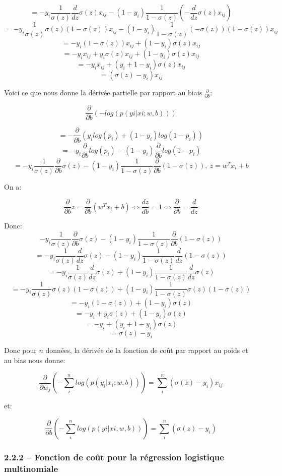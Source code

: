 \documentclass[
]{article}
\begin{document}
\[=-y_i \frac{1}{\sigma (z)}\frac{d}{dz}\sigma (z)x_{ij} - (1 - y_i)\frac{1}{1 - \sigma (z)}\left(-\frac{d}{dz} \sigma (z)x_{ij}\right)\]
\[=-y_i \frac{1}{\sigma (z)}\sigma (z) (1 - \sigma (z)) x_{ij} - (1 - y_i)\frac{1}{1 - \sigma (z)}(- \sigma (z))(1 - \sigma(z))x_{ij}\]
\[=-y_i (1 - \sigma (z)) x_{ij} + (1 - y_i)\sigma (z)x_{ij}\]
\[=-y_i x_{ij} + y_i \sigma (z) x_{ij} + (1 - y_i)\sigma (z)x_{ij}\]
\[=-y_i x_{ij} + (y_i + 1 - y_i)\sigma (z)x_{ij}\]
\[=(\sigma(z) - y_i)x_{ij}\]

Voici ce que nous donne la dérivée partielle par rapport au biais
\(\frac{\partial}{\partial b}\):

\[\frac{\partial}{\partial b}\left(-log(p(yi|xi;w,b))\right)\]

\[=-\frac{\partial}{\partial b}(y_i log(p_i) + (1 - y_i)log(1 - p_i))\]
\[=-y_i \frac{\partial}{\partial b}log(p_i) - (1 - y_i)\frac{\partial}{\partial b}log(1 - p_i)\]
\[=-y_i \frac{1}{\sigma (z)}\frac{\partial}{\partial b} \sigma(z) - (1 - y_i) \frac{1}{1 - \sigma (z)} \frac{\partial}{\partial b}(1 - \sigma (z)),\ z = w^T x_i + b\]

On a:

\[\frac{\partial}{\partial b} z = \frac{\partial}{\partial b}(w^T x_i + b) \Leftrightarrow \frac{dz}{db} = 1 \Leftrightarrow \frac{\partial}{\partial b} = \frac{d}{dz}\]

Donc:
\[-y_i \frac{1}{\sigma (z)}\frac{\partial}{\partial b} \sigma(z) - (1 - y_i) \frac{1}{1 - \sigma (z)} \frac{\partial}{\partial b}(1 - \sigma (z))\]
\[=-y_i \frac{1}{\sigma (z)}\frac{d}{dz} \sigma(z) - (1 - y_i) \frac{1}{1 - \sigma (z)} \frac{d}{dz}(1 - \sigma (z))\]
\[=-y_i \frac{1}{\sigma (z)}\frac{d}{dz} \sigma(z) + (1 - y_i) \frac{1}{1 - \sigma (z)} \frac{d}{dz}\sigma (z)\]
\[=-y_i \frac{1}{\sigma (z)}\sigma(z) (1 - \sigma (z)) + (1 - y_i) \frac{1}{1 - \sigma (z)} \sigma (z)(1 - \sigma (z))\]
\[=-y_i (1 - \sigma (z)) + (1 - y_i)\sigma (z)\]
\[=-y_i + y_i \sigma (z) + (1 - y_i)\sigma (z)\]
\[=-y_i + (y_i + 1 - y_i)\sigma (z)\] \[=\sigma (z) - y_i\]

Donc pour \(n\) données, la dérivée de la fonction de coût par rapport
au poids et au bias nous donne:

\[\frac{\partial}{\partial w_j}\left( - \sum_i^n log(p(y_i|x_i;w,b))\right) = \sum_i^n(\sigma(z) - y_i)x_{ij}\]

et:

\[\frac{\partial}{\partial b}\left(- \sum_i^n log(p(yi|xi;w,b))\right) = \sum_i^n (\sigma (z) - y_i)\]

\subsubsection{2.2.2 -- Fonction de coût pour la régression logistique
multinomiale}\label{fonction-de-couxfbt-pour-la-ruxe9gression-logistique-multinomiale}
\end{document}
